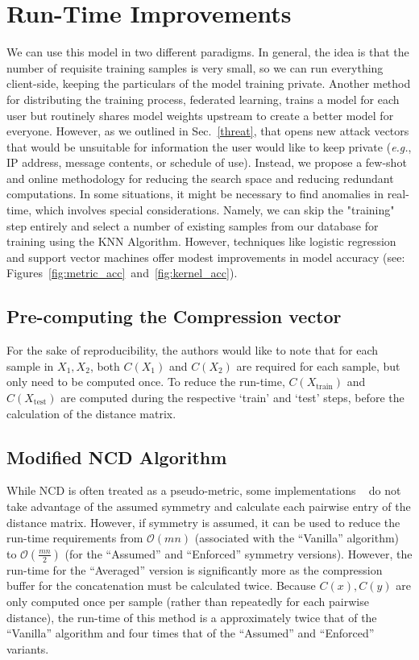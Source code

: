 \documentclass[conference]{IEEEtran}
\begin{document}
\section{Run-Time Improvements}
\label{improvements}
We can use this model in two different paradigms. In general, the idea is that the number of requisite training samples is very small, so we can run everything client-side, keeping the particulars of the model training private. Another method for distributing the training process, federated learning, trains a model for each user but routinely shares model weights upstream to create a better model for everyone. 
However, as we outlined in Sec.~\ref{threat}, that opens new attack vectors that would be unsuitable for information the user would like to keep private (\textit{e.g.}, IP address, message contents, or schedule of use). 
Instead, we propose a few-shot and online methodology for reducing the search space and reducing redundant computations.
In some situations, it might be necessary to find anomalies in real-time, which involves special considerations. 
Namely, we can skip the "training" step entirely and select a number of existing samples from our database for training using the KNN Algorithm.
However, techniques like logistic regression and support vector machines offer modest improvements in model accuracy (see: Figures~\ref{fig:metric_acc}~and~\ref{fig:kernel_acc}).




\subsection{Pre-computing the Compression vector}
For the sake of reproducibility, the authors would like to note that for each sample in $X_1, X_2$, both $C(X_1)$ and $C(X_2)$ are required for each sample, but only need to be computed once. To reduce the run-time, $C(X_{\text{train}})$ and $C(X_{\text{test}})$ are computed during the respective `train' and `test' steps, before the calculation of the distance matrix.


\subsection{Modified NCD Algorithm}

While NCD is often treated as a pseudo-metric, some implementations ~\cite{jiang2022less} do not take advantage of the assumed symmetry and calculate each pairwise entry of the distance matrix. 
However, if symmetry is assumed, it can be used to reduce the run-time requirements from $\mathcal{O}(mn)$ (associated with the ``Vanilla'' algorithm) to $\mathcal{O}(\frac{mn}{2})$ (for the ``Assumed'' and ``Enforced'' symmetry versions). 
However, the run-time for the ``Averaged'' version is significantly more as the compression buffer for the concatenation must be calculated twice. 
Because $C(x), C(y)$ are only computed once per sample (rather than repeatedly for each pairwise distance), the run-time of this method is a approximately twice that of the ``Vanilla'' algorithm and four times that of the ``Assumed'' and ``Enforced'' variants. 
\end{document}
